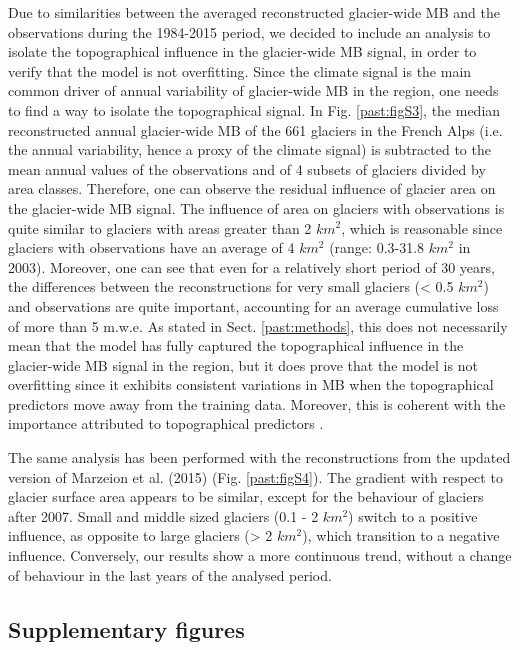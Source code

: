 Due to similarities between the averaged reconstructed glacier-wide MB and the observations during the 1984-2015 period, we decided to include an analysis to isolate the topographical influence in the glacier-wide MB signal, in order to verify that the model is not overfitting. Since the climate signal is the main common driver of annual variability of glacier-wide MB in the region, one needs to find a way to isolate the topographical signal. In Fig. \ref{past:figS3}, the median reconstructed annual glacier-wide MB of the 661 glaciers in the French Alps (i.e. the annual variability, hence a proxy of the climate signal) is subtracted to the mean annual values of the observations and of 4 subsets of glaciers divided by area classes. Therefore, one can observe the residual influence of glacier area on the glacier-wide MB signal. The influence of area on glaciers with observations is quite similar to glaciers with areas greater than 2 $km^{2}$, which is reasonable since glaciers with observations have an average of 4 $km^{2}$ (range: 0.3-31.8 $km^{2}$ in 2003). Moreover, one can see that even for a relatively short period of 30 years, the differences between the reconstructions for very small glaciers (< 0.5 $km^{2}$) and observations are quite important, accounting for an average cumulative loss of more than 5 m.w.e. As stated in Sect. \ref{past:methods}, this does not necessarily mean that the model has fully captured the topographical influence in the glacier-wide MB signal in the region, but it does prove that the model is not overfitting since it exhibits consistent variations in MB when the topographical predictors move away from the training data. Moreover, this is coherent with the importance attributed to topographical predictors \citep{bolibar_deep_2020-1}. 

The same analysis has been performed with the reconstructions from the updated version of Marzeion et al. (2015) (Fig. \ref{past:figS4}). The gradient with respect to glacier surface area appears to be similar, except for the behaviour of glaciers after 2007. Small and middle sized glaciers (0.1 - 2 $km^{2}$) switch to a positive influence, as opposite to large glaciers (> 2 $km^{2}$), which transition to a negative influence. Conversely, our results show a more continuous trend, without a change of behaviour in the last years of the analysed period. 

\newpage
\subsection{Supplementary figures}

